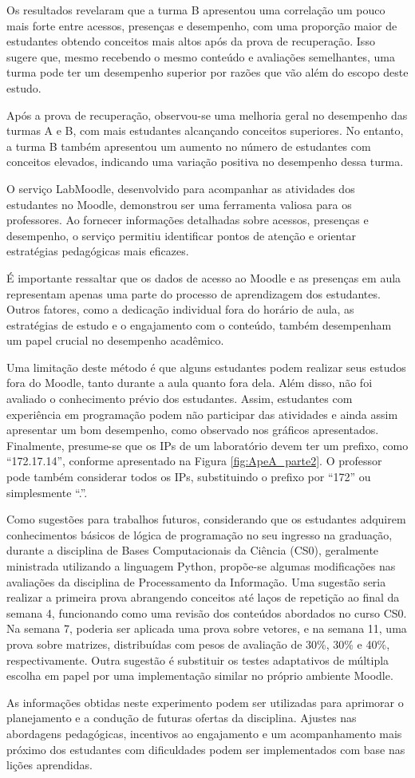 Os resultados revelaram que a turma B apresentou uma correlação um pouco mais forte entre acessos, presenças e desempenho, com uma proporção maior de estudantes obtendo conceitos mais altos após da prova de recuperação. Isso sugere que, mesmo recebendo o mesmo conteúdo e avaliações semelhantes, uma turma pode ter um desempenho superior por razões que vão além do escopo deste estudo.

Após a prova de recuperação, observou-se uma melhoria geral no desempenho das turmas A e B, com mais estudantes alcançando conceitos superiores. No entanto, a turma B também apresentou um aumento no número de estudantes com conceitos elevados, indicando uma variação positiva no desempenho dessa turma.

O serviço LabMoodle, desenvolvido para acompanhar as atividades dos estudantes no Moodle, demonstrou ser uma ferramenta valiosa para os professores. Ao fornecer informações detalhadas sobre acessos, presenças e desempenho, o serviço permitiu identificar pontos de atenção e orientar estratégias pedagógicas mais eficazes.

É importante ressaltar que os dados de acesso ao Moodle e as presenças em aula representam apenas uma parte do processo de aprendizagem dos estudantes. Outros fatores, como a dedicação individual fora do horário de aula, as estratégias de estudo e o engajamento com o conteúdo, também desempenham um papel crucial no desempenho acadêmico.

Uma limitação deste método é que alguns estudantes podem realizar seus estudos fora do Moodle, tanto durante a aula quanto fora dela. Além disso, não foi avaliado o conhecimento prévio dos estudantes. Assim, estudantes com experiência em programação podem não participar das atividades e ainda assim apresentar um bom desempenho, como observado nos gráficos apresentados. Finalmente, presume-se que os IPs de um laboratório devem ter um prefixo, como ``172.17.14'', conforme apresentado na Figura \ref{fig:ApeA_parte2}. O professor pode também considerar todos os IPs, substituindo o prefixo por ``172'' ou simplesmente ``.''.

Como sugestões para trabalhos futuros, considerando que os estudantes adquirem conhecimentos básicos de lógica de programação no seu ingresso na graduação, durante a disciplina de Bases Computacionais da Ciência (CS0), geralmente ministrada utilizando a linguagem Python, propõe-se algumas modificações nas avaliações da disciplina de Processamento da Informação. Uma sugestão seria realizar a primeira prova abrangendo conceitos até laços de repetição ao final da semana 4, funcionando como uma revisão dos conteúdos abordados no curso CS0. Na semana 7, poderia ser aplicada uma prova sobre vetores, e na semana 11, uma prova sobre matrizes, distribuídas com pesos de avaliação de 30\%, 30\% e 40\%, respectivamente. Outra sugestão é substituir os testes adaptativos de múltipla escolha em papel por uma implementação similar no próprio ambiente Moodle.

As informações obtidas neste experimento podem ser utilizadas para aprimorar o planejamento e a condução de futuras ofertas da disciplina. Ajustes nas abordagens pedagógicas, incentivos ao engajamento e um acompanhamento mais próximo dos estudantes com dificuldades podem ser implementados com base nas lições aprendidas.

